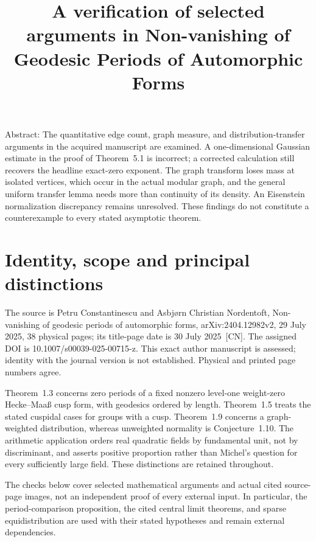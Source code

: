 \documentclass[10pt]{article}
\title{A verification of selected arguments in
Non-vanishing of Geodesic Periods of Automorphic Forms}
\author{}
\date{}
\begin{document}
\maketitle
Abstract: The quantitative edge count, graph measure, and distribution-transfer arguments in the acquired manuscript are examined. A one-dimensional Gaussian estimate in the proof of Theorem 5.1 is incorrect; a corrected calculation still recovers the headline exact-zero exponent. The graph transform loses mass at isolated vertices, which occur in the actual modular graph, and the general uniform transfer lemma needs more than continuity of its density. An Eisenstein normalization discrepancy remains unresolved. These findings do not constitute a counterexample to every stated asymptotic theorem.\par
\section*{Identity, scope and principal distinctions}
The source is Petru Constantinescu and Asbjørn Christian Nordentoft, Non-vanishing of geodesic periods of automorphic forms, arXiv:2404.12982v2, 29 July 2025, 38 physical pages; its title-page date is 30 July 2025 [CN]. The assigned DOI is 10.1007/s00039-025-00715-z. This exact author manuscript is assessed; identity with the journal version is not established. Physical and printed page numbers agree.\par
Theorem 1.3 concerns zero periods of a fixed nonzero level-one weight-zero Hecke–Maaß cusp form, with geodesics ordered by length. Theorem 1.5 treats the stated cuspidal cases for groups with a cusp. Theorem 1.9 concerns a graph-weighted distribution, whereas unweighted normality is Conjecture 1.10. The arithmetic application orders real quadratic fields by fundamental unit, not by discriminant, and asserts positive proportion rather than Michel’s question for every sufficiently large field. These distinctions are retained throughout.\par
The checks below cover selected mathematical arguments and actual cited source-page images, not an independent proof of every external input. In particular, the period-comparison proposition, the cited central limit theorems, and sparse equidistribution are used with their stated hypotheses and remain external dependencies.\par
\end{document}
